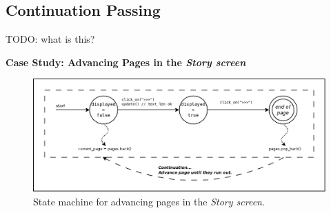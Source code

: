 \documentclass{vgtc}                          %
\begin{document}
\subsection{Continuation Passing}

TODO: what is this?

\textbf{Case Study: Advancing Pages in the \emph{Story screen}}


\begin{figure}[t]
\centering
\includegraphics[width=\columnwidth]{story}
\caption{State machine for advancing pages in the \emph{Story screen}.
\label{fig.story}
}
\end{figure}
\end{document}
